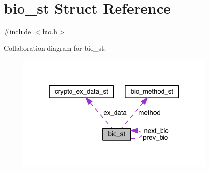 \hypertarget{structbio__st}{}\section{bio\+\_\+st Struct Reference}
\label{structbio__st}


{\ttfamily \#include $<$bio.\+h$>$}



Collaboration diagram for bio\+\_\+st\+:\nopagebreak
\begin{figure}[H]
\begin{center}
\leavevmode
\includegraphics[width=278pt]{structbio__st__coll__graph}
\end{center}
\end{figure}
